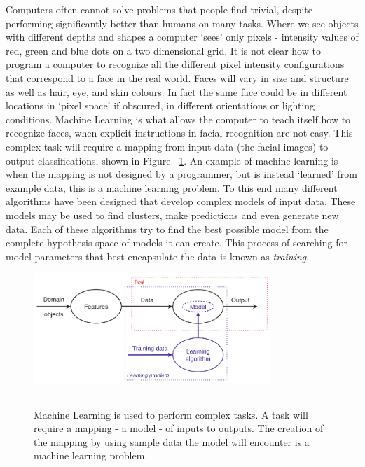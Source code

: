 Computers often cannot solve problems that people find trivial, despite performing significantly better than humans on many tasks.
Where we see objects with different depths and shapes a computer `sees' only pixels - intensity values of red, green and blue dots on a two dimensional grid.
It is not clear how to program a computer to recognize all the different pixel intensity configurations that correspond to a face in the real world.
Faces will vary in size and structure as well as hair, eye, and skin colours.
In fact the same face could be in different locations in `pixel space' if obscured, in different orientations or lighting conditions.
Machine Learning is what allows the computer to teach itself how to recognize faces, when explicit instructions in facial recognition are not easy.
This complex task will require a mapping from input data (the facial images) to output classifications, shown in Figure ~\ref{fig:machine_learning}.
An example of machine learning is when the mapping is not designed by a programmer, but is instead `learned' from example data, this is a machine learning problem.
To this end many different algorithms have been designed that develop complex models of input data.
These models may be used to find clusters, make predictions and even generate new data.
Each of these algorithms try to find the best possible model from the complete hypothesis space of models it can create.
This process of searching for model parameters that best encapsulate the data is known as \textit{training}.
\begin{figure}[htbp]
\centering
\includegraphics[width = 0.8\textwidth]{./Figures/machine_learning_peter_flach.jpg}
\rule{35em}{0.5pt}
\caption[Machine Learning]{Machine Learning is used to perform complex tasks. A task will require a mapping - a model - of inputs to outputs. The creation of the mapping by using sample data the model will encounter is a machine learning problem. }
\label{fig:machine_learning}
\end{figure}


